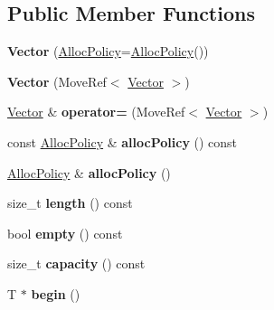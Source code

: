 \subsection*{Public Member Functions}
\begin{DoxyCompactItemize}
\item 
\hypertarget{classjs_1_1_vector_aaba681664ad80aa6e49833597fda69bc}{{\bfseries Vector} (\hyperlink{class_alloc_policy}{Alloc\-Policy}=\hyperlink{class_alloc_policy}{Alloc\-Policy}())}\label{classjs_1_1_vector_aaba681664ad80aa6e49833597fda69bc}

\item 
\hypertarget{classjs_1_1_vector_a2039c1845b879b50433e200a75d5d6b1}{{\bfseries Vector} (Move\-Ref$<$ \hyperlink{classjs_1_1_vector}{Vector} $>$)}\label{classjs_1_1_vector_a2039c1845b879b50433e200a75d5d6b1}

\item 
\hypertarget{classjs_1_1_vector_a3709179d9318b43fb61afdfbc456a9d8}{\hyperlink{classjs_1_1_vector}{Vector} \& {\bfseries operator=} (Move\-Ref$<$ \hyperlink{classjs_1_1_vector}{Vector} $>$)}\label{classjs_1_1_vector_a3709179d9318b43fb61afdfbc456a9d8}

\item 
\hypertarget{classjs_1_1_vector_aef924f26c8d1857acf40d3aed7341275}{const \hyperlink{class_alloc_policy}{Alloc\-Policy} \& {\bfseries alloc\-Policy} () const }\label{classjs_1_1_vector_aef924f26c8d1857acf40d3aed7341275}

\item 
\hypertarget{classjs_1_1_vector_ab84d4645107b3f10c987f8f1bbba2371}{\hyperlink{class_alloc_policy}{Alloc\-Policy} \& {\bfseries alloc\-Policy} ()}\label{classjs_1_1_vector_ab84d4645107b3f10c987f8f1bbba2371}

\item 
\hypertarget{classjs_1_1_vector_a36d862370dce43281c541b842f20b009}{size\-\_\-t {\bfseries length} () const }\label{classjs_1_1_vector_a36d862370dce43281c541b842f20b009}

\item 
\hypertarget{classjs_1_1_vector_a413c3cdb80d72484fc2d5a8c2740f0c1}{bool {\bfseries empty} () const }\label{classjs_1_1_vector_a413c3cdb80d72484fc2d5a8c2740f0c1}

\item 
\hypertarget{classjs_1_1_vector_af989d8d525038c98eeabb4147f353e35}{size\-\_\-t {\bfseries capacity} () const }\label{classjs_1_1_vector_af989d8d525038c98eeabb4147f353e35}

\item 
\hypertarget{classjs_1_1_vector_a26a8efd9470e24c75e9776d5819b1476}{T $\ast$ {\bfseries begin} ()}\label{classjs_1_1_vector_a26a8efd9470e24c75e9776d5819b1476}


\end{DoxyCompactItemize}
